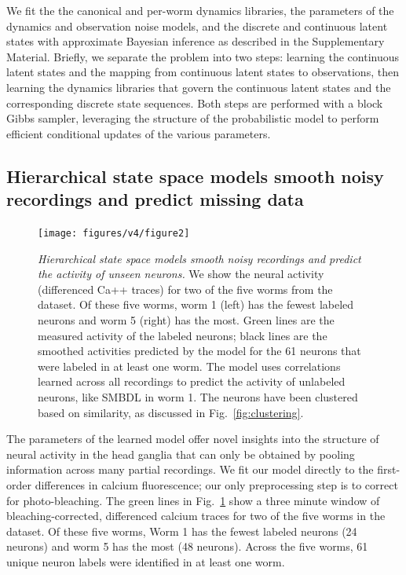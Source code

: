 \documentclass[11pt]{article}
\begin{document}
We fit the the canonical and per-worm dynamics libraries, the
parameters of the dynamics and observation noise models, and the
discrete and continuous latent states with approximate Bayesian
inference as described in the Supplementary Material. Briefly, we
separate the problem into two steps: learning the continuous latent
states and the mapping from continuous latent states to observations,
then learning the dynamics libraries that govern the continuous latent
states and the corresponding discrete state sequences.  Both steps are
performed with a block Gibbs sampler, leveraging the structure of the
probabilistic model to perform efficient conditional updates of the
various parameters. 

\subsection*{Hierarchical state space models smooth noisy recordings and predict missing data}

\begin{figure}[t!]
\centering
\texttt{[image: figures/v4/figure2]} 
\caption{ \textit{Hierarchical state space models smooth noisy
    recordings and predict the activity of unseen neurons.}  We show
  the neural activity (differenced Ca++ traces) for two of the
  five worms from the \citet{kato2015global} dataset.  Of these five
  worms, worm 1 (left) has the fewest labeled neurons and worm 5
  (right) has the most.  Green lines are the measured activity of the
  labeled neurons; black lines are the smoothed activities predicted
  by the model for the 61 neurons that were labeled in at least one
  worm.  The model uses correlations learned across all recordings to
  predict the activity of unlabeled neurons, like \textsf{SMBDL} in
  worm 1.  The neurons have been clustered based on similarity, as
  discussed in Fig.~\ref{fig:clustering}.  }
\label{fig:smoothing}
\end{figure}


The parameters of the learned model offer novel insights into the
structure of neural activity in the head ganglia that can only be
obtained by pooling information across many partial recordings.  We
fit our model directly to the first-order differences in calcium
fluorescence; our only preprocessing step is to correct for
photo-bleaching. The green lines in Fig.~\ref{fig:smoothing} show a
three minute window of bleaching-corrected, differenced calcium traces
for two of the five worms in the~\citet{kato2015global} dataset. Of
these five worms, Worm 1 has the fewest labeled neurons (24 neurons)
and worm 5 has the most (48 neurons). Across the five worms, 61 unique
neuron labels were identified in at least one worm.
\end{document}
